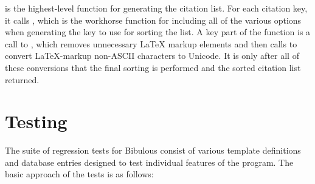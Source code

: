 \documentclass[letterpaper,10pt,english]{sphinxmanual}
\begin{document}
 is the highest-level function for generating the citation list. For each citation key, it calls , which is the workhorse function for including all of the various options when generating the key to use for sorting the list. A key part of the function is a call to , which removes unnecessary LaTeX markup elements and then calls  to convert LaTeX-markup non-ASCII characters to Unicode. It is only after all of these conversions that the final sorting is performed and the sorted citation list returned.


\section{Testing}
\label{developer_guide:testing}
The suite of regression tests for Bibulous consist of various template definitions and database entries designed to test individual features of the program. The basic approach of the tests is as follows:
\end{document}

